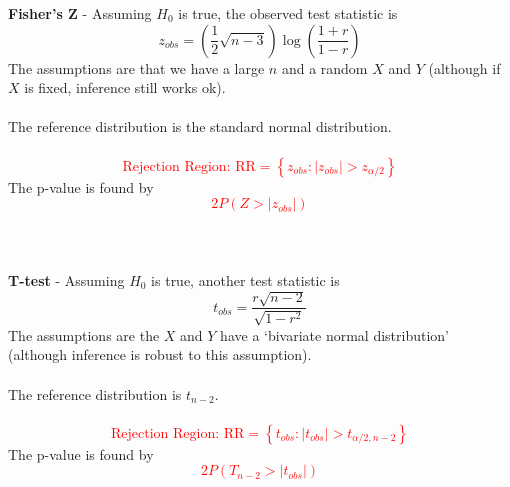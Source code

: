 \textbf{Fisher's Z} - Assuming $H_0$ is true, the observed test statistic is 
$$z_{obs}=\left(\frac{1}{2}\sqrt{n-3}\right)\log\left(\frac{1+r}{1-r}\right)$$
The assumptions are that we have a large $n$ and a random $X$ and $Y$ (although if $X$ is fixed, inference still works ok).\\~\\
The reference distribution is the standard normal distribution.  \\~\\
\textcolor{red}{$$\mbox{Rejection Region: RR}=\left\{z_{obs}:|z_{obs}|>z_{\alpha/2}\right\}$$}
The p-value is found by %
\textcolor{red}{$$2P(Z>|z_{obs}|)$$\\~\\~\\}
\textbf{T-test} - Assuming $H_0$ is true, another test statistic is
$$t_{obs}=\frac{r\sqrt{n-2}}{\sqrt{1-r^2}}$$
The assumptions are the $X$ and $Y$ have a `bivariate normal distribution' (although inference is robust to this assumption).\\~\\
The reference distribution is $t_{n-2}$.\\~\\
\textcolor{red}{$$\mbox{Rejection Region: RR}=\left\{t_{obs}:|t_{obs}|>t_{\alpha/2,n-2}\right\}$$}
The p-value is found by 
\textcolor{red}{$$2P(T_{n-2}>|t_{obs}|)$$}

\newpage


